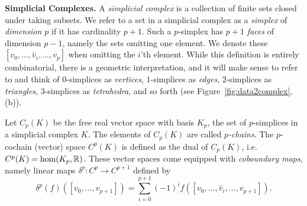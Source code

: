 \textbf{Simplicial Complexes.} A \emph{simplicial complex} is a collection of finite sets closed under taking subsets. We refer to a set in a simplicial complex as a \emph{simplex} of \emph{dimension $p$} if it has cardinality $p+1$. Such a $p$-simplex has $p+1$ \emph{faces} of dimension $p-1$, namely the sets omitting one element. We denote these $[v_0,\dotsc,\hat{v}_i,\dotsc, v_p]$ when omitting the $i$'th element. While this definition is entirely combinatorial, there is a geometric interpretation, and it will make sense to refer to and think of $0$-simplices as \emph{vertices}, $1$-simplices as \emph{edges}, $2$-simplices as \emph{triangles}, $3$-simplices as \emph{tetrahedra}, and so forth (see Figure~\ref{fig:data2complex}, (b)).

Let $C_p(K)$ be the free real vector space with basis $K_p$, the set of $p$-simplices in a simplicial complex $K$. The elements of $C_p(K)$ are called \emph{$p$-chains}. The $p$-cochain (vector) space $C^p(K)$ is defined as the dual of $C_p(K)$, i.e. $C^p(K)=\hom(K_p,\mathbb{R})$. These vector spaces come equipped with \emph{coboundary maps}, namely linear maps $\delta^p:C^p\to C^{p+1}$ defined by
\begin{equation*}
\delta^p(f)([v_0,\dotsc,v_{p+1}]) = \sum_{i=0}^{p+1} (-1)^i f([v_0,\dotsc,\hat{v}_i,\dotsc,v_{p+1}]).
\end{equation*}

